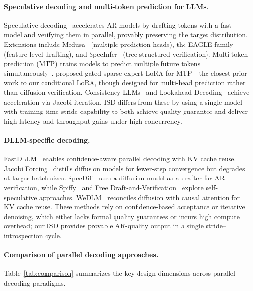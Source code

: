 \paragraph{Speculative decoding and multi-token prediction for LLMs.}
Speculative decoding~\citep{leviathan2023speculative, chen2023speculative} accelerates AR models by drafting tokens with a fast model and verifying them in parallel, provably preserving the target distribution.
Extensions include Medusa~\citep{medusa2024} (multiple prediction heads), the EAGLE family~\citep{eagle2024, eagle3} (feature-level drafting), and SpecInfer~\citep{specinfer2023} (tree-structured verification).
Multi-token prediction (MTP) trains models to predict multiple future tokens simultaneously~\citep{gloeckle2024mtp}.
\citet{applemtp2025} proposed gated sparse expert LoRA for MTP---the closest prior work to our conditional LoRA, though designed for multi-head prediction rather than diffusion verification.
Consistency LLMs~\citep{cllms2024} and Lookahead Decoding~\citep{lookahead2024} achieve acceleration via Jacobi iteration.
ISD differs from these by using a single model with training-time stride capability to both achieve quality guarantee and deliver high latency and throughput gains under high concurrency.

\paragraph{DLLM-specific decoding.}
FastDLLM~\citep{fastdllm2025} enables confidence-aware parallel decoding with KV cache reuse.
Jacobi Forcing~\citep{jacobiforcing2025} distills diffusion models for fewer-step convergence but degrades at larger batch sizes.
SpecDiff~\citep{specdiff2024} uses a diffusion model as a drafter for AR verification, while Spiffy~\citep{spiffy2025} and Free Draft-and-Verification~\citep{freedraftverify2025} explore self-speculative approaches.
WeDLM~\citep{wedlm2025} reconciles diffusion with causal attention for KV cache reuse.
These methods rely on confidence-based acceptance or iterative denoising, which either lacks formal quality guarantees or incurs high compute overhead; our ISD provides provable AR-quality output in a single stride--introspection cycle.

\paragraph{Comparison of parallel decoding approaches.}
Table~\ref{tab:comparison} summarizes the key design dimensions across parallel decoding paradigms.

